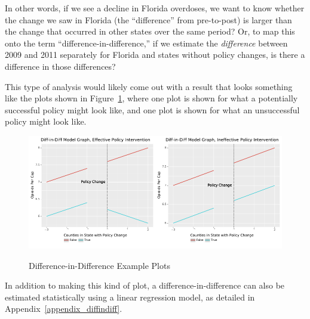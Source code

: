 \documentclass[12pt]{article}
\begin{document}
In other words, if we see a decline in Florida overdoses, we want to know whether the change we saw in Florida (the ``difference'' from pre-to-post) is larger than the change that occurred in other states over the same period? Or, to map this onto the term ``difference-in-difference,'' if we estimate the \emph{difference} between 2009 and 2011 separately for Florida and states without policy changes, is there a difference in those differences?

This type of analysis would likely come out with a result that looks something like the plots shown in Figure~\ref{figure_diffindiff_examples}, where one plot is shown for what a potentially successful policy might look like, and one plot is shown for what an unsuccessful policy might look like.

\begin{figure}[h!]
  \centering
  \caption{Difference-in-Difference Example Plots}\label{figure_diffindiff_examples}
  \includegraphics[width=0.5\textwidth]{images/diffindiff_successful.pdf}\includegraphics[width=0.5\textwidth]{images/diffindiff_failed.pdf}
\end{figure}

In addition to making this kind of plot, a difference-in-difference can also be estimated statistically using a linear regression model, as detailed in Appendix~\ref{appendix_diffindiff}.
\end{document}
